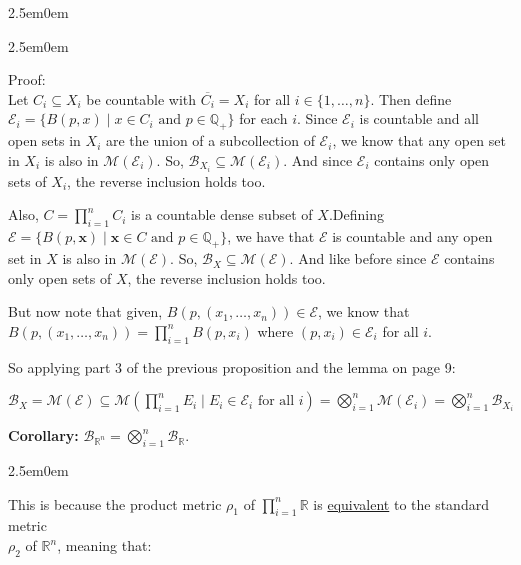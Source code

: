 \documentclass{book}
\newcommand{\hThree}{%
   \color{PineGreen!85!Orange}
   \fontsize{12}{14}\selectfont%
}
\newenvironment{myIndent}{%
   \begin{adjustwidth}{2.5em}{0em}%
}{%
   \end{adjustwidth}%
}
\newcommand{\udefine}[1]{{%
   \setulcolor{Red}%
   \setul{0.14em}{0.07em}%
   \ul{#1}%
}}
\newcommand{\blab}[1]{\textbf{#1}}
\newcommand{\retTwo}{\hfill\bigbreak}
\begin{document}
\begin{myIndent}
\begin{itemize}
      \begin{myIndent}\hThree
         Proof:\\
         Let $C_i \subseteq X_i$ be countable with $\overline{C_i} = X_i$ for all $i \in \{1, \ldots, n\}$. Then define $\mathcal{E}_i = \{B(p, x) \mid x \in C_i \text{ and } p \in \mathbb{Q}_+\}$ for each $i$. Since $\mathcal{E}_i$ is countable and all open sets in $X_i$ are the union of a subcollection of $\mathcal{E}_i$, we know that any open set in $X_i$ is also in $\mathcal{M}(\mathcal{E}_i)$. So, $\mathcal{B}_{X_i} \subseteq \mathcal{M}(\mathcal{E}_i)$.  And since $\mathcal{E}_i$ contains only open sets of $X_i$, the reverse inclusion holds too.\retTwo

         Also, $C = \prod\limits_{i=1}^n C_i$ is a countable dense subset of $X$.\retTwo Defining $\mathcal{E} = \{B(p, \bm{x}) \mid \bm{x} \in C \text{ and } p \in \mathbb{Q}_+\}$, we have that $\mathcal{E}$ is countable and any open set in $X$ is also in $\mathcal{M}(\mathcal{E})$. So, $\mathcal{B}_{X} \subseteq \mathcal{M}(\mathcal{E})$. And like before since $\mathcal{E}$ contains only open sets of $X$, the reverse inclusion holds too. \retTwo

         But now note that given, $B(p, (x_1, \ldots, x_n)) \in \mathcal{E}$, we know that\\ $B(p, (x_1, \ldots, x_n)) = \prod\limits_{i = 1}^n B(p, x_i)$ where $(p, x_i) \in \mathcal{E}_i$ for all $i$.\retTwo
         
         So applying part 3 of the previous proposition and the lemma on page 9:

         {\centering\fontsize{12}{14}\selectfont $\mathcal{B}_X = \mathcal{M}(\mathcal{E}) \subseteq \mathcal{M}\left(\prod\limits_{i = 1}^n E_i \mid E_i \in \mathcal{E}_i \text{ for all } i\right) = \bigotimes\limits_{i=1}^n \mathcal{M}(\mathcal{E}_i) = \bigotimes\limits_{i = 1}^n \mathcal{B}_{X_i}$ \retTwo\par}
      \end{myIndent}
   \end{itemize}

   \blab{Corollary:} $\mathcal{B}_{\mathbb{R}^n} = \bigotimes\limits_{i = 1}^n \mathcal{B}_\mathbb{R}$.

   \begin{myIndent}\hThree
      This is because the product metric $\rho_1$ of $\prod\limits_{i=1}^n \mathbb{R}$ is \udefine{equivalent} to the standard metric\\ [-8pt] $\rho_2$ of $\mathbb{R}^n$, meaning that: 
      

\end{myIndent}
\end{myIndent}
\end{document}
